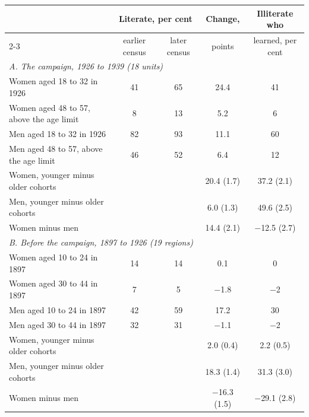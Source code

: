 \begin{tabular}{lcccc}
\toprule
 & \multicolumn{2}{c}{Literate, per cent} & Change, & Illiterate who \\
\cmidrule(lr){2-3}
 & earlier census & later census & points & learned, per cent \\
\midrule
\multicolumn{5}{l}{\textit{A. The campaign, 1926 to 1939 (18 units)}} \\
Women aged 18 to 32 in 1926 & 41 & 65 & 24.4 & 41 \\
Women aged 48 to 57, above the age limit & 8 & 13 & 5.2 & 6 \\
Men aged 18 to 32 in 1926 & 82 & 93 & 11.1 & 60 \\
Men aged 48 to 57, above the age limit & 46 & 52 & 6.4 & 12 \\
Women, younger minus older cohorts & & & 20.4 (1.7) & 37.2 (2.1) \\
Men, younger minus older cohorts & & & 6.0 (1.3) & 49.6 (2.5) \\
Women minus men & & & 14.4 (2.1) & $-$12.5 (2.7) \\
\midrule
\multicolumn{5}{l}{\textit{B. Before the campaign, 1897 to 1926 (19 regions)}} \\
Women aged 10 to 24 in 1897 & 14 & 14 & 0.1 & 0 \\
Women aged 30 to 44 in 1897 & 7 & 5 & $-$1.8 & $-$2 \\
Men aged 10 to 24 in 1897 & 42 & 59 & 17.2 & 30 \\
Men aged 30 to 44 in 1897 & 32 & 31 & $-$1.1 & $-$2 \\
Women, younger minus older cohorts & & & 2.0 (0.4) & 2.2 (0.5) \\
Men, younger minus older cohorts & & & 18.3 (1.4) & 31.3 (3.0) \\
Women minus men & & & $-$16.3 (1.5) & $-$29.1 (2.8) \\
\bottomrule
\end{tabular}
